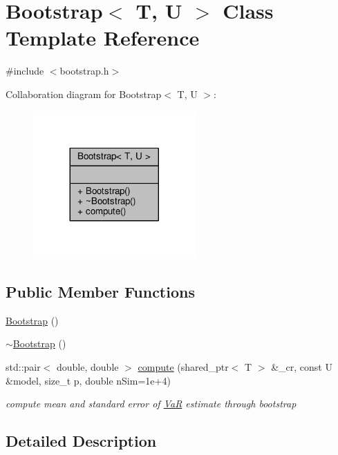 \hypertarget{classBootstrap}{}\section{Bootstrap$<$ T, U $>$ Class Template Reference}
\label{classBootstrap}


{\ttfamily \#include $<$bootstrap.\+h$>$}



Collaboration diagram for Bootstrap$<$ T, U $>$\+:
\nopagebreak
\begin{figure}[H]
\begin{center}
\leavevmode
\includegraphics[width=176pt]{classBootstrap__coll__graph}
\end{center}
\end{figure}
\subsection*{Public Member Functions}
\begin{DoxyCompactItemize}
\item 
\hyperlink{classBootstrap_a35eb4a8e35d20976bd01125462192e33}{Bootstrap} ()
\item 
\hyperlink{classBootstrap_aabc424eb11af216716a5ce6169953b26}{$\sim$\+Bootstrap} ()
\item 
std\+::pair$<$ double, double $>$ \hyperlink{classBootstrap_a2b25d49ce7f6e289974a0d6b3a019581}{compute} (shared\+\_\+ptr$<$ T $>$ \&\+\_\+cr, const U \&model, size\+\_\+t p, double n\+Sim=1e+4)
\begin{DoxyCompactList}\small\item\em compute mean and standard error of \hyperlink{classVaR}{VaR} estimate through bootstrap \end{DoxyCompactList}\end{DoxyCompactItemize}


\subsection{Detailed Description}
